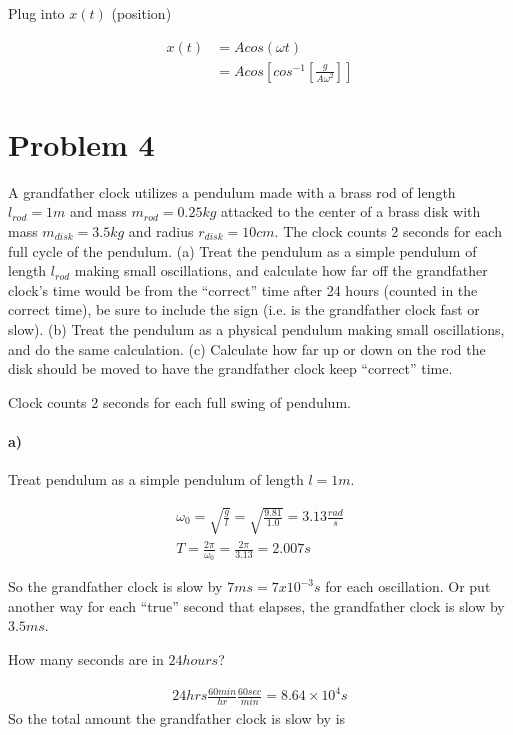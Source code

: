 \documentclass[10pt]{article}
\newcommand{\boxeq}[1]{%
  \begin{center}%
    \boxed{#1}%
  \end{center}%
}
\begin{document}
Plug into $x(t)$ (position)

\begin{align*}
  x(t) &= Acos(\omega t)\\
       &= Acos\left[cos^{-1}\left[\frac{g}{A\omega^2}\right]\right]
\end{align*}

\boxeq{x(t)=\frac{g}{\omega^2}=0.25m}

\section*{Problem 4}
\label{sec:problem_4}

A grandfather clock utilizes a pendulum made with a brass rod of length
$l_{rod}=1m$ and mass $m_{rod}=0.25kg$ attacked to the center of a brass disk
with mass $m_{disk}=3.5kg$ and radius $r_{disk}=10cm$. The clock counts 2
seconds for each full cycle of the pendulum. (a) Treat the pendulum as a simple
pendulum of length $l_{rod}$ making small oscillations, and calculate how far
off the grandfather clock's time would be from the ``correct'' time after 24
hours (counted in the correct time), be sure to include the sign (i.e. is the
grandfather clock fast or slow). (b) Treat the pendulum as a physical pendulum
making small oscillations, and do the same calculation. (c) Calculate how far
up or down on the rod the disk should be moved to have the grandfather clock
keep ``correct'' time.

Clock counts 2 seconds for each full swing of pendulum.

\paragraph{a)}
\label{par:a_}

Treat pendulum as a simple pendulum of length $l=1m$.

\begin{align*}
  \omega_0=\sqrt{\frac{g}{l}}=\sqrt{\frac{9.81}{1.0}} = 3.13 \frac{rad}{s}\\
  T = \frac{2\pi}{\omega_0}=\frac{2\pi}{3.13}=2.007 s
\end{align*}

So the grandfather clock is slow by $7ms=7x10^{-3}s$ for each oscillation. Or
put another way for each ``true'' second that elapses, the grandfather clock is
slow by $3.5ms$.

How many seconds are in $24hours$?

\begin{align*}
  24hrs\frac{60min}{hr}\frac{60sec}{min}=8.64\times 10^4s
\end{align*}
So the total amount the grandfather clock is slow by is
\end{document}
